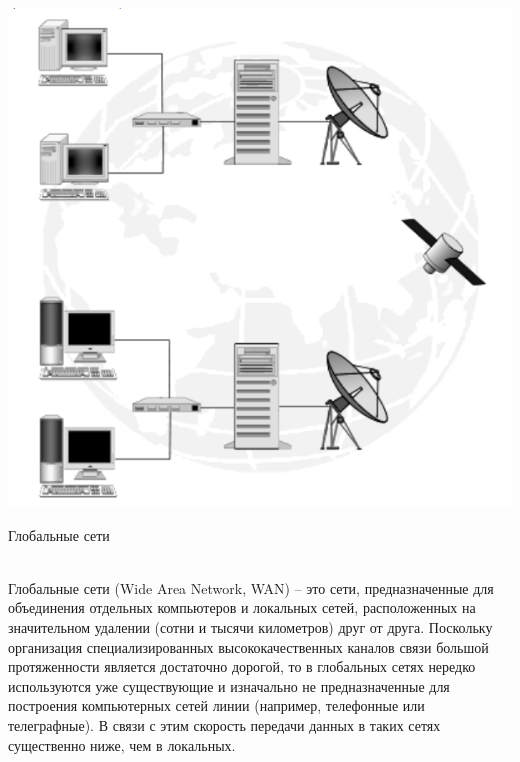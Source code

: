 \documentclass[a4paper,14pt]{extarticle}
\begin{document}
\centering
\includegraphics[width=0.9\linewidth]{n3.png}
\newline
\caption{Глобальные сети}\\
Глобальные сети (Wide Area Network, WAN) – это сети, предназначенные для объединения отдельных компьютеров и локальных сетей, расположенных на значительном удалении (сотни и тысячи километров) друг от друга. Поскольку организация специализированных высококачественных каналов связи большой протяженности является достаточно дорогой, то в глобальных сетях нередко используются уже существующие и изначально не предназначенные для построения компьютерных сетей линии (например, телефонные или телеграфные). В связи с этим скорость передачи данных в таких сетях существенно ниже, чем в локальных.
\end{document}
